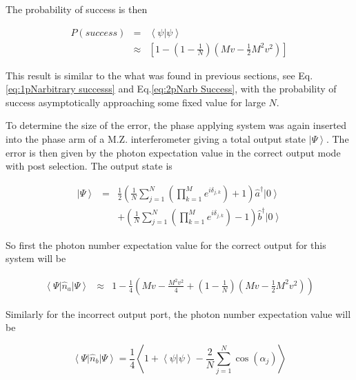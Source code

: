 \documentclass[aps,pra,twocolumn,superscriptaddress,numerical]{revtex4-1}
\begin{document}
		
		The probability of success is then
		
		\begin{eqnarray}
		P\left(success\right) & = & \left\langle \psi|\psi\right\rangle \nonumber \\
		& \approx & \left[1-\left(1-\frac{1}{N}\right)\left(Mv-\frac{1}{2}M^{2}v^{2}\right)\right]\label{eq:AveEndProbSuccess}
		\end{eqnarray}
		
		
		This result is similar to the what was found in previous sections, see Eq.\ref{eq:1pNarbitrary successs} and Eq.\ref{eq:2pNarb Success}, with the probability of success asymptotically approaching some fixed value for large $N$.
		
		To determine the size of the error, the phase applying system was again inserted into the phase arm of a M.Z. interferometer giving a total output state $\left|\Psi\right\rangle $. The error is then given by the photon expectation value in the correct output mode with post selection. The output state is
		
		\begin{eqnarray}
		\left|\Psi\right\rangle & = &\frac{1}{2}\left(\frac{1}{N}\sum_{j=1}^{N}\left(\prod_{k=1}^{M}e^{i\delta_{j,k}}\right)+1\right)\hat{a}^{\dagger}\left|0\right\rangle \\ & & +\left(\frac{1}{N}\sum_{j=1}^{N}\left(\prod_{k=1}^{M}e^{i\delta_{j,k}}\right)-1\right)\hat{b}^{\dagger}\left|0\right\rangle \label{eq:AveEndIntState}
		\end{eqnarray}
		
		
		So first the photon number expectation value for the correct output for this system will be
		
		\begin{widetext}
			\begin{eqnarray}
			\left\langle \Psi\right|\hat{n}_{a}\left|\Psi\right\rangle  
			& \approx & 1-\frac{1}{4}\left(Mv-\frac{M^{2}v^{2}}{4}+\left(1-\frac{1}{N}\right)\left(Mv-\frac{1}{2}M^{2}v^{2}\right)\right)
			\end{eqnarray}
		\end{widetext}	
		
		Similarly for the incorrect output port, the photon number expectation value will be
		
		\begin{equation}
		\left\langle \Psi\right|\hat{n}_{b}\left|\Psi\right\rangle = \frac{1}{4}\left\langle 1+\left\langle \psi|\psi\right\rangle -\frac{2}{N}\sum_{j=1}^{N}\cos\left(\alpha_{j}\right)\right\rangle 
		\end{equation}
		
\end{document}
